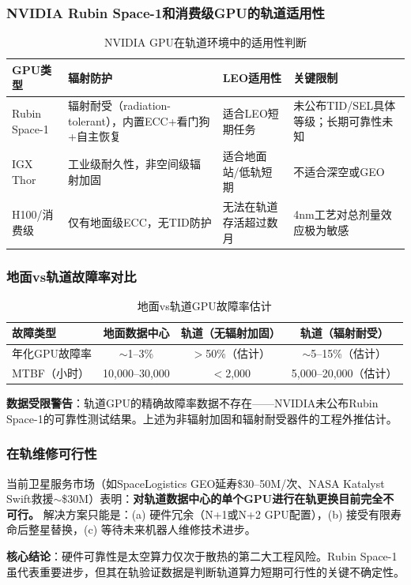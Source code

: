 \subsubsection{NVIDIA Rubin Space-1和消费级GPU的轨道适用性}

\begin{table}[H]
\centering
\caption{NVIDIA GPU在轨道环境中的适用性判断}
\label{tab:gpu_space}
\begin{tabular}{p{2.5cm}p{3.5cm}p{3.5cm}p{3.5cm}}
\toprule
\textbf{GPU类型} & \textbf{辐射防护} & \textbf{LEO适用性} & \textbf{关键限制} \\
\midrule
Rubin Space-1 & 辐射耐受（radiation-tolerant），内置ECC+看门狗+自主恢复 & 适合LEO短期任务 & 未公布TID/SEL具体等级；长期可靠性未知 \\
\hline
IGX Thor & 工业级耐久性，非空间级辐射加固 & 适合地面站/低轨短期 & 不适合深空或GEO \\
\hline
H100/消费级 & 仅有地面级ECC，无TID防护 & 无法在轨道存活超过数月 & 4nm工艺对总剂量效应极为敏感 \\
\bottomrule
\end{tabular}
\end{table}

\subsubsection{地面vs轨道故障率对比}

\begin{table}[H]
\centering
\caption{地面vs轨道GPU故障率估计}
\label{tab:failure_rate}
\begin{tabular}{p{3.5cm}ccc}
\toprule
\textbf{故障类型} & \textbf{地面数据中心} & \textbf{轨道（无辐射加固）} & \textbf{轨道（辐射耐受）} \\
\midrule
年化GPU故障率 & $\sim$1--3\% & $>$50\%（估计） & $\sim$5--15\%（估计） \\
MTBF（小时） & 10,000--30,000 & $<$2,000 & 5,000--20,000（估计） \\
\bottomrule
\end{tabular}
\end{table}

\textbf{数据受限警告}：轨道GPU的精确故障率数据不存在——NVIDIA未公布Rubin Space-1的可靠性测试结果。上述为非辐射加固和辐射耐受器件的工程外推估计\cite{newspace2025h100,theclaw2026rubin}。

\subsubsection{在轨维修可行性}

当前卫星服务市场（如SpaceLogistics GEO延寿\$30--50M/次、NASA Katalyst Swift救援$\sim$\$30M）表明：\textbf{对轨道数据中心的单个GPU进行在轨更换目前完全不可行。} 解决方案只能是：(a) 硬件冗余（N+1或N+2 GPU配置），(b) 接受有限寿命后整星替换，(c) 等待未来机器人维修技术进步\cite{nasa2026katalyst,eamvision2025satellite}。

\textbf{核心结论}：硬件可靠性是太空算力仅次于散热的第二大工程风险。Rubin Space-1虽代表重要进步，但其在轨验证数据是判断轨道算力短期可行性的关键不确定性。

